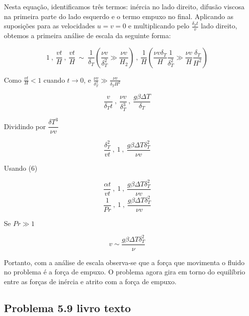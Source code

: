 \documentclass[12pt]{article}
\begin{document}
Nesta equação, identificamos três termos: inércia no lado direito, difusão viscosa na primeira parte do lado esquerdo e o termo empuxo no final. Aplicando as suposições para as velocidades $u = v = 0$ e multiplicando pelo $\frac{\delta_{T} t }{v}$ lado direito, obtemos a primeira análise de escala da seguinte forma:


\begin{equation}
	1 \ , \ \frac{vt}{H} \ , \  \frac{vt}{H} \ \sim \ \frac{1}{\delta_{T}} \left(  \frac{\nu v }{\delta_{T}^{2}}  \gg  \frac{\nu v }{H_{2}}\right)  \ , \     \frac{1}{H}\left(  \frac{\nu v \delta_{T} }{H}  \frac{1}{\delta_{T}^{2}}  \gg   \frac{\nu v  }{H}  \frac{\delta_{T}}{H^{2}}\right) 
\end{equation} 

Como $\frac{vt}{H} < 1 $ cuando $t \rightarrow 0$, e $\frac{\nu v }{\delta_{T}^{3}}\gg \frac{\nu v }{\delta_{T}H^{2}}$

\begin{equation}
	 \frac{v}{\delta_{T}t} \ , \  \frac{\nu v}{\delta_{T}^{3}}   \ , \ \frac{ g\beta\Delta T}{\delta_{T}}
\end{equation}

Dividindo por $\dfrac{\delta T^{3}}{\nu v}$

\begin{equation}
	\frac{\delta_{T}^{2}}{vt} \ , \ 1 \ , \ \frac{ g\beta\Delta T \delta_{T}^{2}}{\nu v}
\end{equation}

Usando (6)

\begin{equation}
	\frac{\alpha t}{vt} \ , \ 1 \ , \ \frac{ g\beta\Delta T \delta_{T}^{2}}{\nu v}
\end{equation}
\begin{equation}
	\frac{1}{Pr} \ , \ 1 \ , \ \frac{ g\beta\Delta T \delta_{T}^{2}}{\nu v}
\end{equation}

Se $Pr\gg 1$

\begin{equation}
	v \sim \frac{ g\beta\Delta T \delta_{T}^{2}}{\nu }
\end{equation}

Portanto, com a análise de escala observa-se que a força que movimenta o fluido no problema é a força de empuxo. O problema agora gira em torno do equilíbrio entre as forças de inércia e atrito com a força de empuxo.


\subsection*{Problema 5.9 livro texto}
\end{document}
